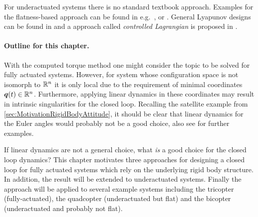For underactuated systems there is no standard textbook approach.
Examples for the flatness-based approach can be found in e.g.\ \cite{RathinamFlatness}, \cite{MurrayFlatCataloge} or \cite[sec.\,7.1]{Martin:FlatSystems}.
General Lyapunov designs can be found in \cite{OlfatiSaberDiss} and a approach called \textit{controlled Lagrangian} is proposed in \cite{bloch2000controlled}.

\paragraph{Outline for this chapter.}
With the computed torque method one might consider the topic to be solved for fully actuated systems.
However, for system whose configuration space is not isomorph to $\mathbb{R}^{n}$ it is only local due to the requirement of minimal coordinates $\boldsymbol{q}(t)\in\mathbb{R}^{n}$.
Furthermore, applying linear dynamics in these coordinates may result in intrinsic singularities for the closed loop.
Recalling the satellite example from \autoref{sec:MotivationRigidBodyAttitude}, it should be clear that linear dynamics for the Euler angles would probably not be a good choice, also see \cite{Konz:AT} for further examples.

If linear dynamics are not a general choice, what \textit{is} a good choice for the closed loop dynamics?
This chapter motivates three approaches for designing a closed loop for fully actuated systems which rely on the underlying rigid body structure.
In addition, the result will be extended to underactuated systems.
Finally the approach will be applied to several example systems including the tricopter (fully-actuated), the quadcopter (underactuated but flat) and the bicopter (underactuated and probably not flat).


